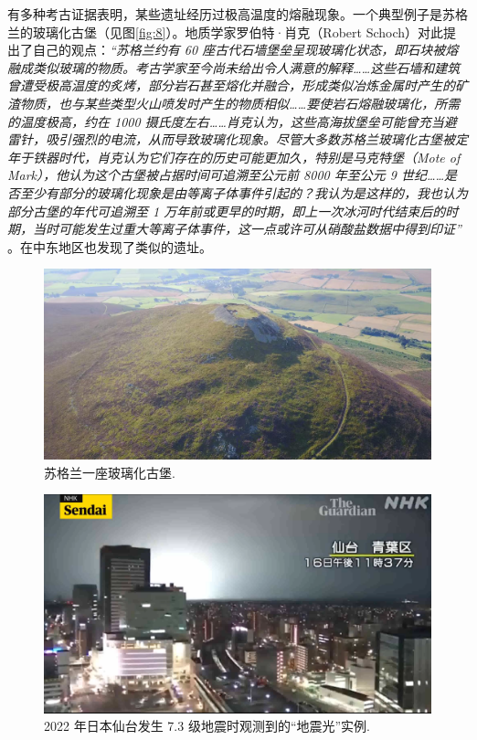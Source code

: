 \documentclass[10pt,twocolumn,letterpaper]{article}
\begin{document}
有多种考古证据表明，某些遗址经历过极高温度的熔融现象。一个典型例子是苏格兰的玻璃化古堡（见图\ref{fig:8}）。地质学家罗伯特·肖克（Robert Schoch）对此提出了自己的观点：\textit{“苏格兰约有 60 座古代石墙堡垒呈现玻璃化状态，即石块被熔融成类似玻璃的物质。考古学家至今尚未给出令人满意的解释……这些石墙和建筑曾遭受极高温度的炙烤，部分岩石甚至熔化并融合，形成类似冶炼金属时产生的矿渣物质，也与某些类型火山喷发时产生的物质相似……要使岩石熔融玻璃化，所需的温度极高，约在 1000 摄氏度左右……肖克认为，这些高海拔堡垒可能曾充当避雷针，吸引强烈的电流，从而导致玻璃化现象。尽管大多数苏格兰玻璃化古堡被定年于铁器时代，肖克认为它们存在的历史可能更加久，特别是马克特堡（Mote of Mark），他认为这个古堡被占据时间可追溯至公元前 8000 年至公元 9 世纪……是否至少有部分的玻璃化现象是由等离子体事件引起的？我认为是这样的，我也认为部分古堡的年代可追溯至 1 万年前或更早的时期，即上一次冰河时代结束后的时期，当时可能发生过重大等离子体事件，这一点或许可从硝酸盐数据中得到印证”} \cite{18,19}。在中东地区也发现了类似的遗址\cite{20,21}。
\begin{figure}[t]
\begin{center}
   \includegraphics[width=1\linewidth]{vitrified.jpeg}
\end{center}
   \caption{苏格兰一座玻璃化古堡\cite{51,52}.}
\label{fig:8}
\label{fig:onecol}
\end{figure}

\begin{figure}[t]
\begin{center}
   \includegraphics[width=1\linewidth]{sendai.png}
\end{center}
   \caption{2022 年日本仙台发生 7.3 级地震时观测到的“地震光”实例\cite{48}.}
\label{fig:9}
\label{fig:onecol}
\end{figure}
\end{document}
